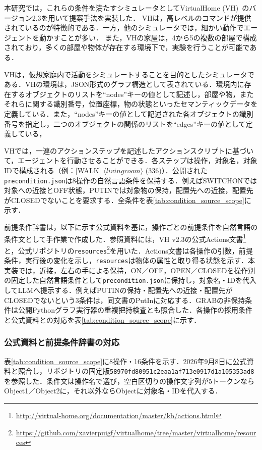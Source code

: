 本研究では，これらの条件を満たすシミュレータとしてVirtualHome (VH)~\cite{Puig_2018_CVPR}のバージョン2.3を用いて提案手法を実装した．
VHは，高レベルのコマンドが提供されているのが特徴的である．一方，他のシミュレータでは，細かい動作でエージェントを動かすことが多い．
また，VHの家屋は，4から5の複数の部屋で構成されており，多くの部屋や物体が存在する環境下で，実験を行うことが可能である．

VHは，仮想家庭内で活動をシミュレートすることを目的としたシミュレータである．VHの環境は，JSON形式のグラフ構造として表されている．環境内に存在するオブジェクトのリストを``nodes''キーの値として記述し，部屋や物，またそれらに関する識別番号，位置座標，物の状態といったセマンティックデータを定義している．また，``nodes''キーの値として記述された各オブジェクトの識別番号を指定し，二つのオブジェクトの関係のリストを``edges''キーの値として定義している，

VHでは，一連のアクションステップを記述したアクションスクリプトに基づいて，エージェントを行動させることができる．各ステップは操作，対象名，対象IDで構成される（例：[WALK] $\langle livingroom\rangle$ (336)）．公開された\texttt{precondition.json}は8操作の自然言語条件を保持する．例えばSWITCHONでは対象への近接とOFF状態，PUTINでは対象物の保持，配置先への近接，配置先がCLOSEDでないことを要求する．全条件を表\ref{tab:condition_source_scope}に示す．

前提条件辞書は，以下に示す公式資料を基に，操作ごとの前提条件を自然言語の条件文として手作業で作成した．参照資料には，VH v2.3の公式Actions文書\footnote{\url{http://virtual-home.org/documentation/master/kb/actions.html}}と，公式リポジトリの\texttt{resources}\footnote{\url{https://github.com/xavierpuigf/virtualhome/tree/master/virtualhome/resources}}を用いた．Actions文書は各操作の引数，前提条件，実行後の変化を示し，\texttt{resources}は物体の属性と取り得る状態を示す．本実装では，近接，左右の手による保持，ON／OFF，OPEN／CLOSEDを操作別の固定した自然言語条件として\texttt{precondition.json}に保持し，対象名・IDを代入してLLMへ提示する．例えばPUTINの保持・配置先への近接・配置先がCLOSEDでないという3条件は，同文書のPutInに対応する．GRABの非保持条件は公開Pythonグラフ実行器の重複把持検査とも照合した．各操作の採用条件と公式資料との対応を表\ref{tab:condition_source_scope}に示す．

\subsubsection{公式資料と前提条件辞書の対応}\label{sec4.condition_sources}
表\ref{tab:condition_source_scope}に8操作・16条件を示す．2026年9月8日に公式資料と照合し，リポジトリの固定版\texttt{58970fd80951c2eaa1af713e0917d1a105353ad8}を参照した．条件文は操作名で選び，空白区切りの操作文字列が5トークンならObject1／Object2に，それ以外ならObjectに対象名・IDを代入する．

